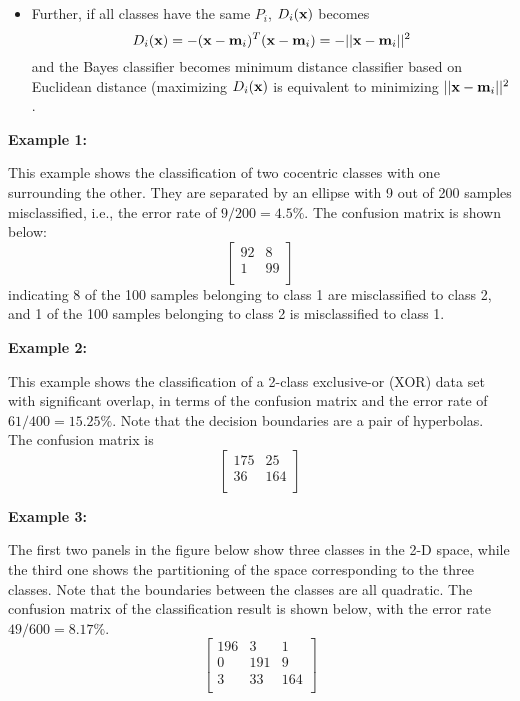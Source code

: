 \documentclass{article}
\begin{document}
\begin{itemize}
\item Further, if all classes have the same $P_i$, $D_i({\bf x})$ becomes
  \begin{equation}	
    D_i({\bf x})=-({\bf x}-{\bf m}_i)^T({\bf x}-{\bf m}_i)=-||{\bf x}-{\bf m}_i||^2
  \end{equation}
  and the Bayes classifier becomes minimum distance classifier based on
  Euclidean distance (maximizing $D_i({\bf x})$ is equivalent to minimizing
  $||{\bf x}-{\bf m}_i||^2$.

\end{itemize}

{\bf Example 1:}

This example shows the classification of two cocentric classes with one
surrounding the other. They are separated by an ellipse with 9 out of 
200 samples misclassified, i.e., the error rate of $9/200=4.5\%$. The 
confusion matrix is shown below:
\begin{equation}
\left[\begin{array}{rrr}
    92 &   8   \\
     1 &  99   \\
\end{array}\right]
\end{equation}
indicating 8 of the 100 samples belonging to class 1 are misclassified
to class 2, and 1 of the 100 samples belonging to class 2 is misclassified
to class 1.


{\bf Example 2:}

This example shows the classification of a 2-class exclusive-or (XOR)
data set with significant overlap, in terms of the confusion matrix and 
the error rate of $61/400=15.25\%$. Note that the decision boundaries
are a pair of hyperbolas. The confusion matrix is 
\begin{equation}
\left[\begin{array}{rrr}
 175 &   25   \\
  36 &  164   \\
\end{array}\right]
\end{equation}


{\bf Example 3:}

The first two panels in the figure below show three classes in the 2-D
space, while the third one shows the partitioning of the space corresponding
to the three classes. Note that the boundaries between the classes are all 
quadratic. The confusion matrix of the classification result is shown below, 
with the error rate $49/600=8.17\%$.
\begin{equation}
\left[\begin{array}{rrr}
    196 & 3 & 1   \\
    0 & 191 & 9   \\
    3 & 33 & 164  \\
\end{array}\right]
\end{equation}
\end{document}
